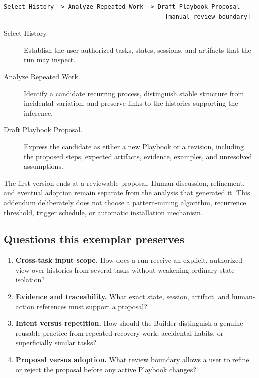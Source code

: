 \documentclass[11pt]{article}
\begin{document}
\begin{lstlisting}[style=playbook]
Select History -> Analyze Repeated Work -> Draft Playbook Proposal
                                             [manual review boundary]
\end{lstlisting}

\begin{description}
  \item[Select History.] Establish the user-authorized tasks, states, sessions, and artifacts that the run may inspect.
  \item[Analyze Repeated Work.] Identify a candidate recurring process, distinguish stable structure from incidental variation, and preserve links to the histories supporting the inference.
  \item[Draft Playbook Proposal.] Express the candidate as either a new Playbook or a revision, including the proposed steps, expected artifacts, evidence, examples, and unresolved assumptions.
\end{description}

The first version ends at a reviewable proposal. Human discussion, refinement, and eventual adoption remain separate from the analysis that generated it. This addendum deliberately does not choose a pattern-mining algorithm, recurrence threshold, trigger schedule, or automatic installation mechanism.

\subsection{Questions this exemplar preserves}

\begin{enumerate}
  \item \textbf{Cross-task input scope.} How does a run receive an explicit, authorized view over histories from several tasks without weakening ordinary state isolation?
  \item \textbf{Evidence and traceability.} What exact state, session, artifact, and human-action references must support a proposal?
  \item \textbf{Intent versus repetition.} How should the Builder distinguish a genuine reusable practice from repeated recovery work, accidental habits, or superficially similar tasks?
  \item \textbf{Proposal versus adoption.} What review boundary allows a user to refine or reject the proposal before any active Playbook changes?
\end{enumerate}
\end{document}
